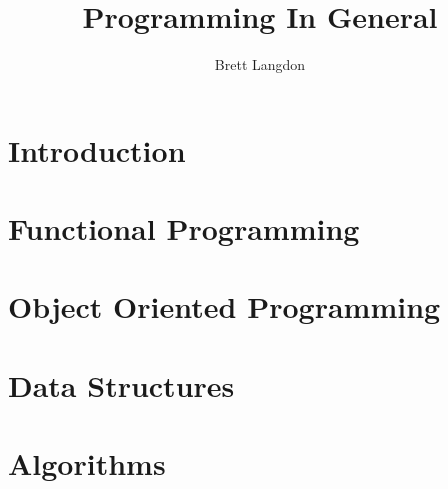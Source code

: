\documentclass[10pt,a4paper,titlepage]{book}
\author{Brett Langdon}
\title{Programming In General}
\begin{document}
\maketitle
\tableofcontents

\chapter{Introduction}


\chapter{Functional Programming}


\chapter{Object Oriented Programming}


\chapter{Data Structures}


\chapter{Algorithms}

\end{document}

